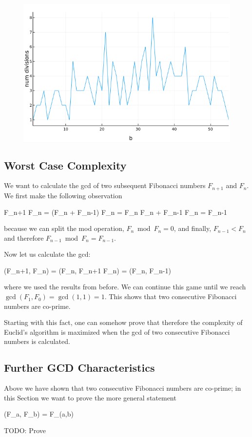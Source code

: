 \begin{figure}[H]
	\includegraphics[scale=0.5]{images/gcd_num_div.png}
\end{figure}


\subsection{Worst Case Complexity}

We want to calculate the gcd of two subsequent Fibonacci numbers $F_{n+1}$ and $F_n$. We first make the following observation

\bee
F_{n+1} \bmod F_n = (F_n + F_{n-1}) \bmod F_n = F_n \bmod F_n + F_{n-1} \bmod F_n = F_{n-1}
\eee

because we can split the mod operation, $F_n \bmod F_n = 0$, and finally, $F_{n-1} < F_n$ and therefore $F_{n-1} \bmod F_n = F_{n-1}$.

Now let us calculate the gcd:

\bee
\gcd(F_{n+1}, F_n) = \gcd(F_n, F_{n+1} \bmod F_n) = \gcd(F_n, F_{n-1})
\eee

where we used the results from before. We can continue this game until we reach $\gcd(F_1, F_0) = \gcd(1,1) = 1$. This shows that two consecutive Fibonacci numbers are co-prime.

Starting with this fact, one can somehow prove that therefore the complexity of Euclid's algorithm is maximized when the gcd of two consecutive Fibonacci numbers is calculated.


\subsection{Further GCD Characteristics}

Above we have shown that two consecutive Fibonacci numbers are co-prime; in this Section we want to prove the more general statement

\bee
\gcd(F_a, F_b) = F_{\gcd(a,b)}
\eee

TODO: Prove
